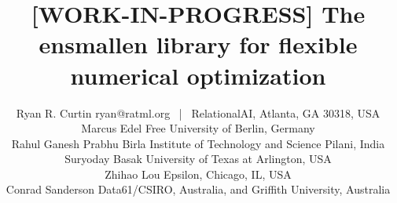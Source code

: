 \documentclass[twoside,11pt]{article}
\begin{document}
\title{\small [WORK-IN-PROGRESS] The ensmallen library for flexible numerical optimization }

\author{%
  \name Ryan R. Curtin \hfill \email ryan@ratml.org ~|~ \addr RelationalAI, Atlanta, GA 30318, USA\\
  \name Marcus Edel \hfill \addr Free University of Berlin, Germany\\
  \name Rahul Ganesh Prabhu \hfill \addr Birla Institute of Technology and Science Pilani, India\\
  \name Suryoday Basak \hfill \addr University of Texas at Arlington, USA\\
  \name Zhihao Lou \hfill \addr Epsilon, Chicago, IL, USA\\
  \name Conrad Sanderson \hfill \addr Data61/CSIRO, Australia, and Griffith University, Australia%
  }



\maketitle
\end{document}

